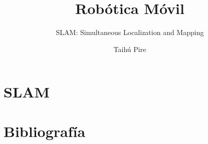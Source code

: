 \documentclass[aspectratio=169,compress]{beamer}
\subtitle{SLAM: Simultaneous Localization and Mapping}
\title{Robótica Móvil}
\author{Taihú Pire}
\institute{Laboratorio de Robótica}
\date{}
\begin{document}
	
	\frame{\titlepage}
	
	\section{SLAM}
	
	
	\section{Bibliografía}
	
	
\end{document}
